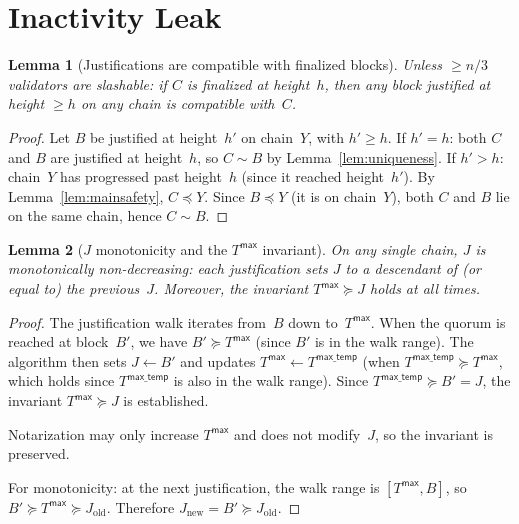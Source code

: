 \documentclass{article}
\theoremstyle{plain}
\newtheorem{lemma}{Lemma}
\theoremstyle{definition}
\theoremstyle{remark}
\begin{document}
\section{Inactivity Leak}

\begin{lemma}[Justifications are compatible with finalized blocks]\label{lem:justcompat}
Unless $\geq n/3$ validators are slashable: if $C$ is finalized at height~$h$, then any block justified at height $\geq h$ on any chain is compatible with~$C$.
\end{lemma}

\begin{proof}
Let $B$ be justified at height~$h'$ on chain~$Y$, with $h' \geq h$.
If $h' = h$: both $C$ and $B$ are justified at height~$h$, so $C \sim B$ by Lemma~\ref{lem:uniqueness}.
If $h' > h$: chain~$Y$ has progressed past height~$h$ (since it reached height~$h'$).
By Lemma~\ref{lem:mainsafety}, $C \preceq Y$.
Since $B \preceq Y$ (it is on chain~$Y$), both $C$ and $B$ lie on the same chain, hence $C \sim B$.
\end{proof}

\begin{lemma}[$J$ monotonicity and the $T^\mathsf{max}$ invariant]\label{lem:jmono}
On any single chain, $J$ is monotonically non-decreasing: each justification sets $J$ to a descendant of (or equal to) the previous~$J$.
Moreover, the invariant $T^\mathsf{max} \succeq J$ holds at all times.
\end{lemma}

\begin{proof}
The justification walk iterates from~$B$ down to~$T^\mathsf{max}$.
When the quorum is reached at block~$B'$, we have $B' \succeq T^\mathsf{max}$ (since $B'$ is in the walk range).
The algorithm then sets $J \gets B'$ and updates $T^\mathsf{max} \gets T^\mathsf{max\_temp}$ (when $T^\mathsf{max\_temp} \succeq T^\mathsf{max}$, which holds since $T^\mathsf{max\_temp}$ is also in the walk range).
Since $T^\mathsf{max\_temp} \succeq B' = J$, the invariant $T^\mathsf{max} \succeq J$ is established.

Notarization may only increase $T^\mathsf{max}$ and does not modify~$J$, so the invariant is preserved.

For monotonicity: at the next justification, the walk range is $[T^\mathsf{max}, B]$, so $B' \succeq T^\mathsf{max} \succeq J_{\mathrm{old}}$.
Therefore $J_{\mathrm{new}} = B' \succeq J_{\mathrm{old}}$.
\end{proof}
\end{document}
